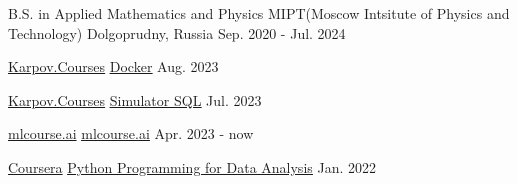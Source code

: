 
\begin{cventries}

  \cventry
  {B.S. in Applied Mathematics and Physics}
  {MIPT(Moscow Intsitute of Physics and Technology)}
  {Dolgoprudny, Russia}
  {Sep. 2020 - Jul. 2024}
  {}

  \cventry
  {\href{https://karpov.courses}{Karpov.Courses}}
  {\href{https://lab.karpov.courses/certificate/e0d12f13-e1ff-4bd0-ac1d-46dcda8aeff7/en/}{\underline{Docker}}}
  {}
  {Aug. 2023}
  {}

  \cventry
  {\href{https://karpov.courses}{Karpov.Courses}}
  {\href{https://lab.karpov.courses/certificate/72ae7efc-d706-4623-b739-e2a7a9a4d75b/en/}{\underline{Simulator SQL}}}
  {}
  {Jul. 2023}
  {}

  \cventry
  {\href{https://mlcourse.ai}{mlcourse.ai}}
  {\href{https://github.com/ilev-sergey/mlcourse}{\underline{mlcourse.ai}}}
  {}
  {Apr. 2023 - now}
  {}

  \cventry
  {\href{https://coursera.org/}{Coursera}}
  {\href{https://coursera.org/share/42912506e140c0586a5a248332a9c86e}{\underline{Python Programming for Data Analysis}}}
  {}
  {Jan. 2022}
  {}

\end{cventries}
